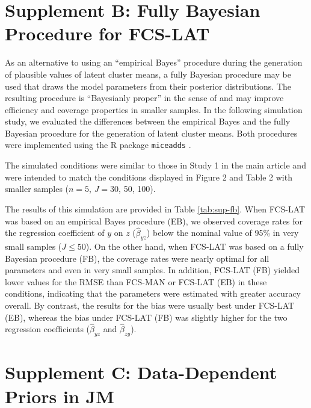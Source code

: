 \documentclass[doc,12pt]{apa6}
\begin{document}

\clearpage

\section{Supplement B: Fully Bayesian Procedure for FCS-LAT}
\label{sec:supb}

As an alternative to using an ``empirical Bayes'' procedure during the generation of plausible values of latent cluster means, a fully Bayesian procedure may be used that draws the model parameters from their posterior distributions.
The resulting procedure is ``Bayesianly proper'' in the sense of \citet{Rubin1987} and may improve efficiency and coverage properties in smaller samples.
In the following simulation study, we evaluated the differences between the empirical Bayes and the fully Bayesian procedure for the generation of latent cluster means.
Both procedures were implemented using the R package \texttt{miceadds} \citep{Robitzsch2017}.

The simulated conditions were similar to those in Study 1 in the main article and were intended to match the conditions displayed in Figure 2 and Table 2 with smaller samples ($n=5$, $J=30$, 50, 100).

The results of this simulation are provided in Table \ref{tab:sup-fb}.
When FCS-LAT was based on an empirical Bayes procedure (EB), we observed coverage rates for the regression coefficient of $y$ on $z$ ($\hat{\beta}_{yz}$) below the nominal value of 95\% in very small samples ($J \leq 50$).
On the other hand, when FCS-LAT was based on a fully Bayesian procedure (FB), the coverage rates were nearly optimal for all parameters and even in very small samples.
In addition, FCS-LAT (FB) yielded lower values for the RMSE than FCS-MAN or FCS-LAT (EB) in these conditions, indicating that the parameters were estimated with greater accuracy overall.
By contrast, the results for the bias were usually best under FCS-LAT (EB), whereas the bias under FCS-LAT (FB) was slightly higher for the two regression coefficients ($\hat{\beta}_{yz}$ and $\hat{\beta}_{zy}$).

\section{Supplement C: Data-Dependent Priors in JM}
\label{sec:supc}
\end{document}
